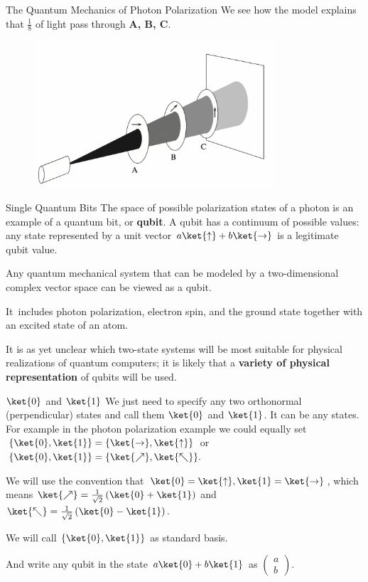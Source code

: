 \documentclass[10pt]{beamer}
\newcommand{\horiz}[0]{\ket{\rightarrow}}
\newcommand{\verti}[0]{\ket{\uparrow}}
\begin{document}
\begin{frame}[fragile]{The Quantum Mechanics of Photon Polarization}
    We see how the model explains that $\frac{1}{8}$ of light pass through \textbf{A, B, C}.
    \begin{figure}[htbp]
          \centering
          \includegraphics[width=0.8\textwidth]{hdv.png}
    \end{figure}
\end{frame}

\begin{frame}[fragile]{Single Quantum Bits}
The space of possible polarization states of a photon is an example of a quantum bit, or \textbf{qubit}. A qubit has a continuum of possible values: any state represented by a unit vector $a\verti + b\horiz$ is a legitimate qubit value.

Any quantum mechanical system that can be modeled by a two-dimensional complex vector space can be viewed as a qubit. 

It~includes photon polarization, electron spin, and the ground state together with an excited state of an atom.

It is as yet unclear which two-state systems will be most suitable for physical realizations of quantum computers; it is likely that a \textbf{variety of physical representation} of qubits will be used.
\end{frame}

\begin{frame}[fragile]{$\ket{0}$ and $\ket{1}$}
We just need to specify any two orthonormal (perpendicular) states and call them $\ket{0}$ and $\ket{1}$. It can be any states. For example in the photon polarization example we could equally set $\{\ket{0}, \ket{1}\} = \{\horiz, \verti\}$ or $\{\ket{0}, \ket{1}\} = \{\ket{\nearrow}, \ket{\nwarrow}\}.$

We will use the convention that $\ket{0} = \verti, \ket{1} = \horiz$, which means $\ket{\nearrow} = \frac{1}{\sqrt{2}} \left(\ket{0} + \ket{1}\right)$  and $\ket{\nwarrow} = \frac{1}{\sqrt{2}} \left(\ket{0} - \ket{1}\right)$.


We will call $\{\ket{0}, \ket{1}\}$ as standard basis. 

And write any qubit in the state $a\ket{0} + b\ket{1}$ as $\begin{pmatrix}
a \\ b
\end{pmatrix}.$
\end{frame}
\end{document}

